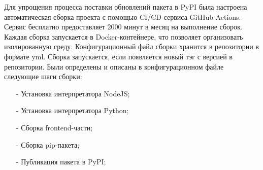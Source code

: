 Для упрощения процесса поставки обновлений пакета в PyPI была настроена автоматическая сборка проекта с помощью CI/CD сервиса GitHub Actions. Сервис бесплатно предоставляет 2000 минут в месяц на выполнение сборок. Каждая сборка запускается в Docker-контейнере, что позволяет организовать изолированную среду. Конфигурационный файл сборки хранится в репозитории в формате yml. Сборка запускается, если появляется новый тэг с версией в репозитории. Были определены и описаны в конфигурационном файле следующие шаги сборки:
\begin{itemize}
	\item[-] Установка интерпретатора NodeJS;
	\item[-] Установка интерпретатора Python;
	\item[-] Сборка frontend-части;
	\item[-] Сборка pip-пакета;
	\item[-] Публикация пакета в PyPI;
\end{itemize}